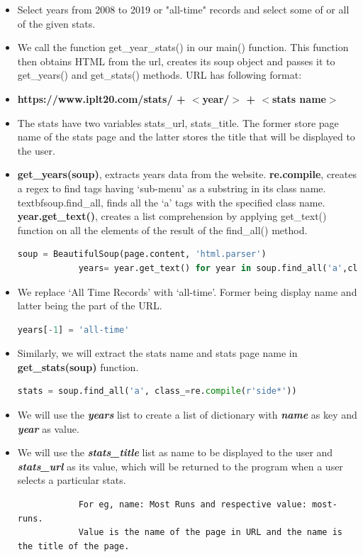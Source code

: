 \documentclass[12pt]{article}
\begin{document}
	\begin{itemize}
		\itemsep 0em
		\item Select years from 2008 to 2019 or "all-time" records and select some of or all of the given stats.
		\item We call the function get\_year\_stats() in our main() function. This function then obtains HTML from the url, creates its soup object and passes it to get\_years() and get\_stats() methods. URL has following format:
		\item[] \textbf{https://www.iplt20.com/stats/ + $<$year/$>$ + $<$stats name$>$}
		\item The stats have two variables stats\_url, stats\_title. The former store page name of the stats page and the latter stores the title that will be displayed to the user.
		\item \textbf{get\_years(soup)}, extracts years data from the website. \textbf{re.compile}, creates a regex to find tags having ‘sub-menu’ as a substring in its class name. textbf{soup.find\_all}, finds all the ‘a’ tags with the specified class name. \textbf{year.get\_text()}, creates a list comprehension by applying get\_text() function on all the elements of the result of the find\_all() method.
		
		\begin{lstlisting}[language=Python]
			soup = BeautifulSoup(page.content, 'html.parser')
			years= year.get_text() for year in soup.find_all('a',class_=re.compile(r'sub-menu*'))\end{lstlisting}
	
		\item We replace ‘All Time Records’ with ‘all-time’. Former being display name and latter being the part of the URL.
		\begin{lstlisting}[language=Python]
			years[-1] = 'all-time'\end{lstlisting}
		\item Similarly, we will extract the stats name and stats page name in \textbf{get\_stats(soup)} function.
		\begin{lstlisting}[language=Python]
			stats = soup.find_all('a', class_=re.compile(r'side*'))\end{lstlisting}
		
		\item We will use the \textbf{\textit{years}} list to create a list of dictionary with \textbf{\textit{name}} as key and \textbf{\textit{year}} as value.
		
		\item We will use the \textbf{\textit{stats\_title}} list as name to be displayed to the user and \textbf{\textit{stats\_url}} as its value, which will be returned to the program when a user selects a particular stats.
		\begin{verbatim}
			For eg, name: Most Runs and respective value: most-runs.
			Value is the name of the page in URL and the name is the title of the page.
		\end{verbatim}
		

\end{itemize}
\end{document}
